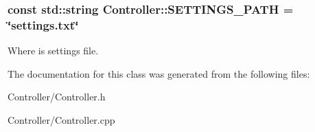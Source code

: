 \subsubsection[{S\+E\+T\+T\+I\+N\+G\+S\+\_\+\+P\+A\+T\+H}]{\setlength{\rightskip}{0pt plus 5cm}const std\+::string Controller\+::\+S\+E\+T\+T\+I\+N\+G\+S\+\_\+\+P\+A\+T\+H = \char`\"{}settings.\+txt\char`\"{}\hspace{0.3cm}{\ttfamily [static]}}\label{class_controller_a8750bb269d145654c359c8a4acb50259}
Where is settings file. 

The documentation for this class was generated from the following files\+:\begin{DoxyCompactItemize}
\item 
Controller/Controller.\+h\item 
Controller/Controller.\+cpp\end{DoxyCompactItemize}
